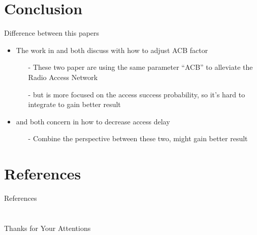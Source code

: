 \documentclass{beamer}
\begin{document}
\section{Conclusion}
\begin{frame}{Difference between this papers}
    \begin{itemize}
        \item {The work in \cite{RACB} and \cite{DACB} both discuss with how to adjust ACB factor}
        \begin{itemize}
            \item [-]{These two paper are using the same parameter ``ACB'' to alleviate the Radio Access Network}
            \item [-]{but \cite{RACB} is more focused on the access success probability, so it's hard to integrate to gain better result}
        \end{itemize}
        \item {\cite{TRAO} and \cite{DACB} both concern in how to decrease access delay}
        \begin{itemize}
            \item [-]{Combine the perspective between these two, might gain better result}
        \end{itemize}
    \end{itemize}
\end{frame}
\section{References}
\calcreferencespagetotal %
\begin{frame}[allowframebreaks]{References}
    \fontsize{9pt}{13}\selectfont
    
    
\end{frame}

\section{}

\begin{frame}
    \centering
    \Large{Thanks for Your Attentions}
\end{frame}
\end{document}
